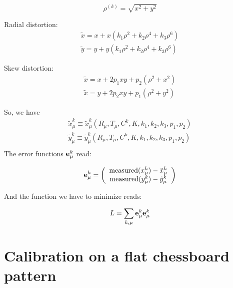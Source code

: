 \documentclass[a4paper,10pt]{article}
\begin{document}
\begin{equation}
 \rho^{(k)} = \sqrt{x^2 + y^2}
\end{equation}

Radial distortion:
{
\begin{equation}
\begin{array}{c}
 \tilde{x} = x + x(k_1 \rho^2 + k_2 \rho^4 + k_3 \rho^6) \\
 \tilde{y} = y + y(k_1 \rho^2 + k_2 \rho^4 + k_3 \rho^6)
\end{array}
\end{equation}
}

Skew distortion:
{
\begin{equation}
 \begin{array}{c}
  \tilde{x} = x + 2 p_1 xy + p_2 \left(\rho^2 + x^2\right) \\
  \tilde{x} = y + 2 p_2 xy + p_1 \left(\rho^2 + y^2\right)
 \end{array}
\end{equation}
}

So, we have
{
\begin{equation}
\begin{array}{c}
 \tilde{x}^k_\mu\equiv \tilde{x}^k_\mu\left(R_\mu, T_\mu, C^k, K, k_1,k_2,k_3, p_1,p_2\right) \\
 \tilde{y}^k_\mu\equiv \tilde{y}^k_\mu\left(R_\mu, T_\mu, C^k, K, k_1,k_2,k_3, p_1,p_2\right) \\
\end{array} 
\end{equation}
}
The error functions ${\bf e}^k_\mu$ read:

{
\begin{equation}
 {\bf e}^k_\mu = \left(
 \begin{array}{c}
                  \operatorname{measured}(x^k_\mu) - \tilde{x}^k_\mu \\
                  \operatorname{measured}({y}^k_\mu) - \tilde{y}^k_\mu \\
                 \end{array}\right)
\end{equation}
}

And the function we have to minimize reads:

\begin{equation}
 L = \sum\limits_{k,\mu} {\bf e}^k_\mu {\bf e}^k_\mu
\end{equation}

\section{Calibration on a flat chessboard pattern}
\end{document}
